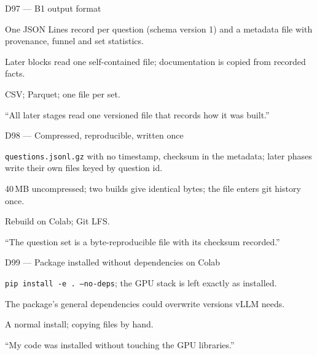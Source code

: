 \documentclass[11pt,a4paper]{report}
\begin{document}
\begin{decisionbox}{D97 --- B1 output format}
\begin{description}[nosep, leftmargin=0pt]
  \item[Decision.] One JSON Lines record per question (schema version 1) and a metadata file with provenance, funnel and set statistics.
  \item[Why.] Later blocks read one self-contained file; documentation is copied from recorded facts.
  \item[Alternatives.] CSV; Parquet; one file per set.
  \item[Interview line.] ``All later stages read one versioned file that records how it was built.''
\end{description}
\end{decisionbox}

\begin{decisionbox}{D98 --- Compressed, reproducible, written once}
\begin{description}[nosep, leftmargin=0pt]
  \item[Decision.] \texttt{questions.jsonl.gz} with no timestamp, checksum in the metadata; later phases write their own files keyed by question id.
  \item[Why.] 40\,MB uncompressed; two builds give identical bytes; the file enters git history once.
  \item[Alternatives.] Rebuild on Colab; Git LFS.
  \item[Interview line.] ``The question set is a byte-reproducible file with its checksum recorded.''
\end{description}
\end{decisionbox}


\begin{decisionbox}{D99 --- Package installed without dependencies on Colab}
\begin{description}[nosep, leftmargin=0pt]
  \item[Decision.] \texttt{pip install -e . --no-deps}; the GPU stack is left exactly as installed.
  \item[Why.] The package's general dependencies could overwrite versions vLLM needs.
  \item[Alternatives.] A normal install; copying files by hand.
  \item[Interview line.] ``My code was installed without touching the GPU libraries.''
\end{description}
\end{decisionbox}
\end{document}
